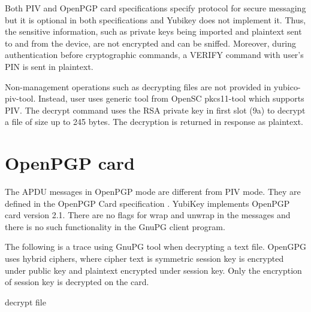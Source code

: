 \documentclass[a4paper]{article}
\begin{document}
Both PIV and OpenPGP card specifications specify protocol for secure messaging but it is optional in both specifications and Yubikey does not implement it. Thus, the sensitive information, such as private keys being imported and plaintext sent to and from the device, are not encrypted and can be sniffed. Moreover, during authentication before cryptographic commands, a VERIFY command with user's PIN is sent in plaintext.

Non-management operations such as decrypting files are not provided in yubico-piv-tool. Instead, user uses generic tool from OpenSC pkcs11-tool which supports PIV. The decrypt command uses the RSA private key in first slot (9a) to decrypt a file of size up to 245 bytes. The decryption is returned in response as plaintext.


\section{OpenPGP card}

The APDU messages in OpenPGP mode are different from PIV mode. They are defined in the OpenPGP Card specification \citep{openpgp}. YubiKey implements OpenPGP card version 2.1. There are no flags for wrap and unwrap in the messages and there is no such functionality in the GnuPG client program.

The following is a trace using GnuPG tool when decrypting a text file. OpenGPG uses hybrid ciphers, where cipher text is symmetric session key is encrypted under public key and plaintext encrypted under session key. Only the encryption of session key is decrypted on the card.

\begin{msc}{decrypt file}
	\nextlevel
	\nextlevel
	\nextlevel
	\nextlevel
\end{msc}




\end{document}
